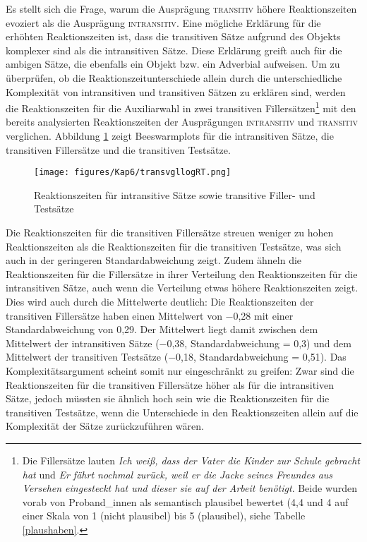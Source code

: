  Es stellt sich die Frage, warum die Ausprägung \textsc{transitiv} höhere Reaktionszeiten evoziert als die Ausprägung \textsc{intransitiv}. Eine mögliche Erklärung für die erhöhten Reaktionszeiten ist, dass die transitiven Sätze aufgrund des Objekts komplexer sind als die intransitiven Sätze. Diese Erklärung greift auch für die ambigen Sätze, die ebenfalls ein Objekt bzw. ein Adverbial aufweisen. Um zu überprüfen, ob die Reaktionszeitunterschiede allein durch die unterschiedliche Komplexität von intransitiven und transitiven Sätzen zu erklären sind, werden die Reaktionszeiten für die Auxiliarwahl in zwei transitiven Fillersätzen\footnote{Die Fillersätze lauten \textit{Ich weiß, dass der Vater die Kinder zur Schule gebracht hat} und \textit{Er fährt nochmal zurück, weil er die Jacke seines Freundes aus Versehen eingesteckt hat und dieser sie auf der Arbeit benötigt}. Beide wurden vorab von Proband\_innen als semantisch plausibel bewertet (4,4 und 4 auf einer Skala von 1 (nicht plausibel) bis 5 (plausibel), siehe Tabelle \ref{plaushaben}.} mit den bereits analysierten Reaktionszeiten der Ausprägungen \textsc{intransitiv} und \textsc{transitiv} verglichen. Abbildung \ref{transvgllogRT} zeigt Beeswarmplots für die intransitiven Sätze, die transitiven Fillersätze und die transitiven Testsätze.

\begin{figure}
\texttt{[image: figures/Kap6/transvgllogRT.png]} 
\caption{Reaktionszeiten für intransitive Sätze sowie transitive Filler- und Testsätze }
\label{transvgllogRT}
\end{figure}

Die Reaktionszeiten für die transitiven Fillersätze streuen weniger zu hohen Reaktionszeiten als die Reaktionszeiten für die transitiven Testsätze, was sich auch in der geringeren Standardabweichung zeigt. Zudem ähneln die Reaktionszeiten für die Fillersätze in ihrer Verteilung den Reaktionszeiten für die intransitiven Sätze, auch wenn die Verteilung etwas höhere Reaktionszeiten zeigt. Dies wird auch durch die Mittelwerte deutlich: Die Reaktions\-zeiten der transitiven Fillersätze haben einen Mittelwert von −0,28 mit einer Standardabweichung von 0,29. Der Mittelwert liegt damit zwischen dem Mittelwert der intransitiven Sätze (−0,38, Standardabweichung = 0,3) und dem Mittelwert der transitiven Testsätze (−0,18, Standardabweichung = 0,51). Das Komplexitäts\-argument scheint somit nur eingeschränkt zu greifen: Zwar sind die Reaktionszeiten für die transitiven Fillersätze höher als für die intransitiven Sätze, jedoch müssten sie ähnlich hoch sein wie die Reaktionszeiten für die transitiven Testsätze, wenn die Unterschiede in den Reaktionszeiten allein auf die Komplexität der Sätze zurückzuführen wären.


